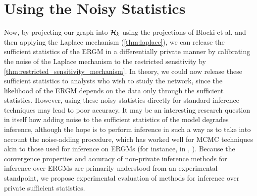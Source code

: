 \section{Using the Noisy Statistics}

Now, by projecting our graph into $\mathcal{H}_k$ using the projections of Blocki et al. \cite{BBDS13} and then applying the Laplace mechanism (\ref{thm:laplace}), we can release the sufficient statistics of the ERGM in a differentially private manner by calibrating the noise of the Laplace mechanism to the restricted sensitivity by \ref{thm:restricted_sensitivity_mechanism}. In theory, we could now release these sufficient statistics to analysts who wish to study the network, since the likelihood of the ERGM depends on the data only through the sufficient statistics. However, using these noisy statistics directly for standard inference techniques may lead to poor accuracy. It may be an interesting research question in itself how adding noise to the sufficient statistics of the model degrades inference, although the hope is to perform inference in such a way as to take into account the noise-adding procedure, which has worked well for MCMC techniques akin to those used for inference on ERGMs (for instance, in \cite{LM14}, \cite{FGWC16}). Because the convergence properties and accuracy of non-private inference methods for inference over ERGMs are primarily understood from an experimental standpoint, we propose experimental evaluation of methods for inference over private sufficient statistics.